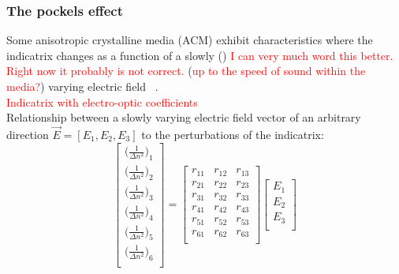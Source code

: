 \subsubsection{The pockels effect}
Some anisotropic crystalline media (ACM) exhibit characteristics where the indicatrix changes as a function of a slowly () \textcolor{red}{I can very much word this better. Right now it probably is not correct.} (\textcolor{red}{up to the speed of sound within the media?}) varying electric field ~\cite{yariv,nye}.
\\
\textcolor{red}{Indicatrix with electro-optic coefficients}
\\
Relationship between a slowly varying electric field vector of an arbitrary direction $\vec{E} = [E_1, E_2, E_3]$ to the perturbations of the indicatrix:
\\
\begin{equation}
  \left[ {\begin{array}{c}
   \big( \frac{1}{\Delta n ^2 } \big)_1 \\
   \big( \frac{1}{\Delta n ^2 } \big)_2 \\
   \big( \frac{1}{\Delta n ^2 } \big)_3 \\
   \big( \frac{1}{\Delta n ^2 } \big)_4 \\
   \big( \frac{1}{\Delta n ^2 } \big)_5 \\
   \big( \frac{1}{\Delta n ^2 } \big)_6 \\

  \end{array} } \right]
  =
%
 \left[ {\begin{array}{ccc}
   r_{11} & r_{12} & r_{13}\\
   r_{21} & r_{22} & r_{23}\\
   r_{31} & r_{32} & r_{33}\\
   r_{41} & r_{42} & r_{43}\\
   r_{51} & r_{52} & r_{53}\\
   r_{61} & r_{62} & r_{63}\\
  \end{array}} \right]
 \left[{\begin{array}{c}
   E_1\\
   E_2\\
   E_3\\
 \end{array}} \right]
\end{equation}


